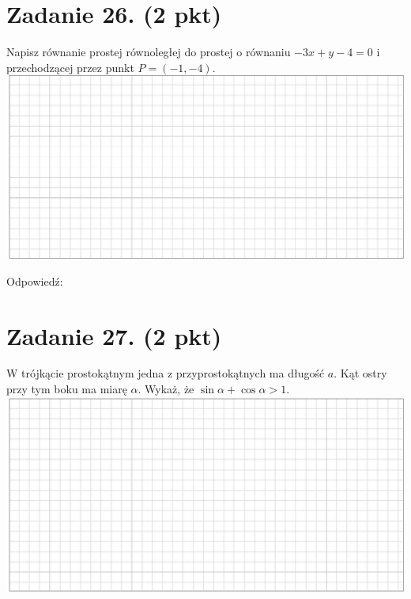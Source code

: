 \documentclass[10pt]{article}
\begin{document}
\section*{Zadanie 26. (2 pkt)}
Napisz równanie prostej równoległej do prostej o równaniu \(-3 x+y-4=0\) i przechodzącej przez punkt \(P=(-1,-4)\).\\
\includegraphics[max width=\textwidth, center]{2024_11_21_3a102e13f4b06a61f46fg-10(1)}

Odpowiedź: \(\qquad\)

\section*{Zadanie 27. (2 pkt)}
W trójkącie prostokątnym jedna z przyprostokątnych ma długość \(a\). Kąt ostry przy tym boku ma miarę \(\alpha\). Wykaż, że \(\sin \alpha+\cos \alpha>1\).\\
\includegraphics[max width=\textwidth, center]{2024_11_21_3a102e13f4b06a61f46fg-10}
\end{document}
